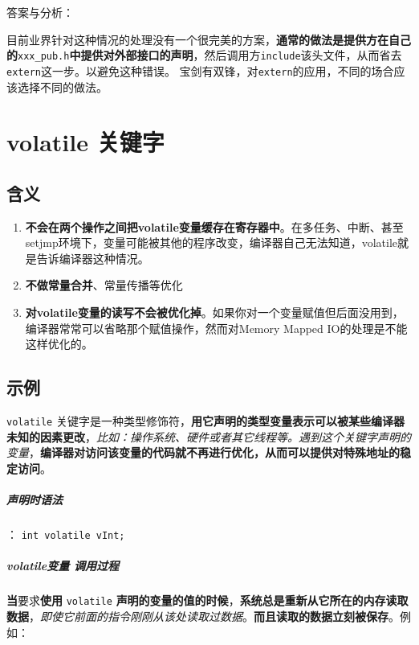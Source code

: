 \documentclass[UTF8,a4paper,12pt]{ctexbook} %
\begin{document}
	        答案与分析：
	        
	        目前业界针对这种情况的处理没有一个很完美的方案，\textbf{通常的做法是提供方在自己的}\verb|xxx_pub.h|\textbf{中提供对外部接口的声明}，然后调用方\verb|include|该头文件，从而省去\verb|extern|这一步。以避免这种错误。
	        宝剑有双锋，对\verb|extern|的应用，不同的场合应该选择不同的做法。
	      
\chapter{volatile 关键字}
	\section{含义}
		\begin{enumerate}
			\item \textbf{不会在两个操作之间把volatile变量缓存在寄存器中}。在多任务、中断、甚至setjmp环境下，变量可能被其他的程序改变，编译器自己无法知道，volatile就是告诉编译器这种情况。
			\item \textbf{不做常量合并}、常量传播等优化
			\item \textbf{对volatile变量的读写不会被优化掉}。如果你对一个变量赋值但后面没用到，编译器常常可以省略那个赋值操作，然而对Memory Mapped IO的处理是不能这样优化的。
		\end{enumerate}
	
	\section{示例}
		\verb|volatile| 关键字是一种类型修饰符，\textbf{用它声明的类型变量表示可以被某些编译器未知的因素更改}，\textit{比如：操作系统、硬件或者其它线程等。遇到这个关键字声明的变量}，\textbf{编译器对访问该变量的代码就不再进行优化，从而可以提供对特殊地址的稳定访问}。
		
		\paragraph{声明时语法}：
			\verb|int volatile vInt; | 
		
		\paragraph{volatile变量 调用过程}
			\textbf{当}要求\textbf{使用} \verb|volatile| \textbf{声明的变量的值的时候}，\textbf{系统总是重新从它所在的内存读取数据}，\textit{即使它前面的指令刚刚从该处读取过数据}。\textbf{而且读取的数据立刻被保存}。例如：
		
\end{document}
